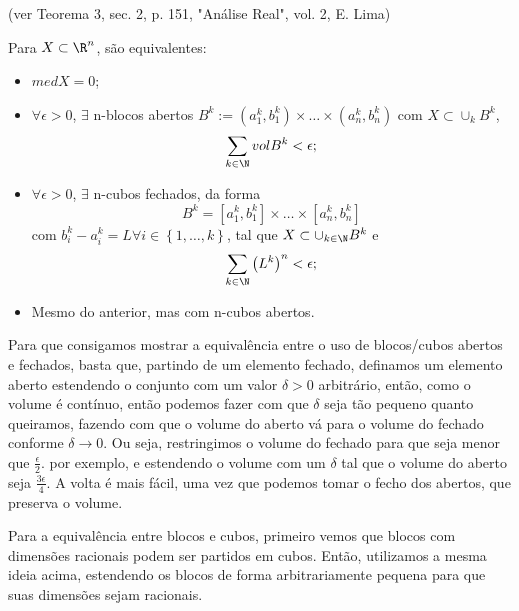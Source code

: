 \begin{prop}
    (ver Teorema 3, sec. 2, p. 151, "Análise Real", vol. 2, E. Lima)

    Para $X\subset \R^{n}$, são equivalentes:
    \begin{itemize}
        \item $med X = 0$;
	\item $\forall \epsilon>0$, $\exists $ n-blocos abertos $B^{k} := \left( a^{k}_1,b_1^{k} \right)\times \ldots\times \left( a^{k}_n,b_n^{k} \right) $ com $X\subset \cup _k B^{k}$, \[
	\sum_{k\in \N} vol B^{k} < \epsilon
	;\] 
	\item $\forall \epsilon>0$, $\exists $ n-cubos fechados, da forma \[
	B^{k}= \left[ a_1^{k},b_1^{k} \right] \times \ldots\times \left[ a_n^{k},b_n^{k} \right]
	\] com $b_i^{k} - a_i^{k}=L \forall i \in \left\{ 1,\ldots,k \right\} $, tal que $X\subset \cup _{k\in \N}B^{k}$ e \[
	\sum_{k\in \N} \left( L^{k} \right) ^{n} < \epsilon
	;\] 
	\item Mesmo do anterior, mas com n-cubos abertos.
    \end{itemize}

    \begin{remark}
	Para que consigamos mostrar a equivalência entre o uso de blocos/cubos abertos e fechados, basta que, partindo de um elemento fechado, definamos um elemento aberto estendendo o conjunto com um valor $\delta > 0$ arbitrário, então, como o volume é contínuo, então podemos fazer com que $\delta$ seja tão pequeno quanto queiramos, fazendo com que o volume do aberto vá para o volume do fechado conforme $\delta\to 0$. Ou seja, restringimos o volume do fechado para que seja menor que $\frac{\epsilon}{2}$. por exemplo, e estendendo o volume com um $\delta$ tal que o volume do aberto seja $\frac{3\epsilon}{4}$. A volta é mais fácil, uma vez que podemos tomar o fecho dos abertos, que preserva o volume.

	Para a equivalência entre blocos e cubos, primeiro vemos que blocos com dimensões racionais podem ser partidos em cubos. Então, utilizamos a mesma ideia acima, estendendo os blocos de forma arbitrariamente pequena para que suas dimensões sejam racionais.
    \end{remark}
\end{prop}

